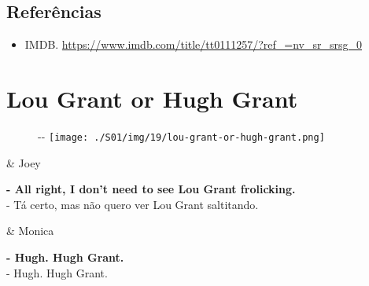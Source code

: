 \hypertarget{referuxeancias}{%
\subsection{Referências}\label{referuxeancias}}

\begin{itemize}
\tightlist
\item
  \sloppy IMDB. \url{https://www.imdb.com/title/tt0111257/?ref_=nv_sr_srsg_0}
\end{itemize}

\hypertarget{lou-grant-or-hugh-grant}{%
\section{Lou Grant or Hugh Grant}\label{lou-grant-or-hugh-grant}}

\begin{figure}[!ht]
  \begin{adjustwidth}{-\oddsidemargin-1in}{-\rightmargin}
    \centering
    \texttt{[image: ./S01/img/19/lou-grant-or-hugh-grant.png]}
  \end{adjustwidth}
\end{figure}

\begin{tcolorbox}[enhanced,center upper,
    drop fuzzy shadow southeast, boxrule=0.3pt,
    lower separated=false, breakable,
    colframe=black!30!dialogoBorder,colback=white]
\begin{minipage}[c]{0.16\linewidth}
   & \centering \scriptsize{Joey}
\end{minipage}
\hfill
\begin{minipage}[c]{0.8\linewidth}
  \textbf{- All right, I don't need to see Lou Grant frolicking.}\\
  - Tá certo, mas não quero ver Lou Grant saltitando.
\end{minipage}

\medskip
\begin{minipage}[c]{0.16\linewidth}
   & \centering \scriptsize{Monica}
\end{minipage}
\hfill
\begin{minipage}[c]{0.8\linewidth}
  \textbf{- Hugh. Hugh Grant.}\\
  - Hugh. Hugh Grant.
\end{minipage}
\end{tcolorbox}

